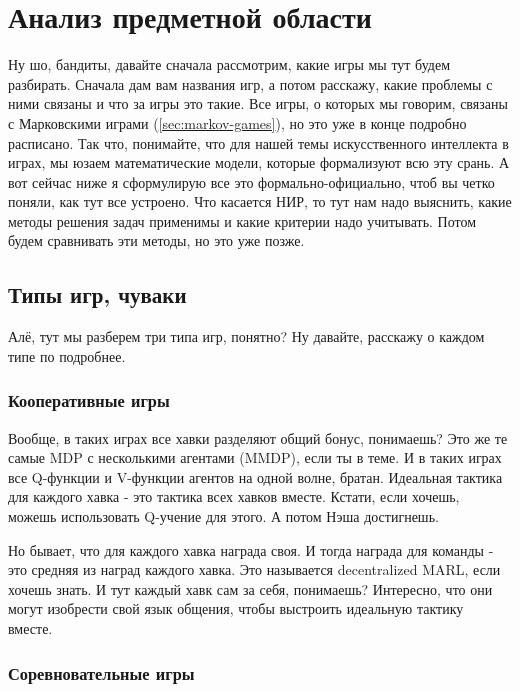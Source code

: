 \chapter{Анализ предметной области}

Ну шо, бандиты, давайте сначала рассмотрим, какие игры мы тут будем разбирать. Сначала дам вам названия игр, а потом расскажу, какие проблемы с ними связаны и что за игры это такие.
Все игры, о которых мы говорим, связаны с Марковскими играми (\ref{sec:markov-games}), но это уже в конце подробно расписано.
Так что, понимайте, что для нашей темы искусственного интеллекта в играх, мы юзаем математические модели, которые формализуют всю эту срань.
А вот сейчас ниже я сформулирую все это формально-официально, чтоб вы четко поняли, как тут все устроено.
Что касается НИР, то тут нам надо выяснить, какие методы решения задач применимы и какие критерии надо учитывать. Потом будем сравнивать эти методы, но это уже позже.

\section{Типы игр, чуваки}

Алё, тут мы разберем три типа игр, понятно? Ну давайте, расскажу о каждом типе по подробнее.

\subsection{Кооперативные игры}

Вообще, в таких играх все хавки разделяют общий бонус, понимаешь? Это же те самые MDP с несколькими агентами (MMDP), если ты в теме. И в таких играх все Q-функции и V-функции агентов на одной волне, братан. Идеальная тактика для каждого хавка - это тактика всех хавков вместе. Кстати, если хочешь, можешь использовать Q-учение для этого. А потом Нэша достигнешь.

Но бывает, что для каждого хавка награда своя. И тогда награда для команды - это средняя из наград каждого хавка. Это называется decentralized MARL, если хочешь знать. И тут каждый хавк сам за себя, понимаешь? Интересно, что они могут изобрести свой язык общения, чтобы выстроить идеальную тактику вместе.

\subsection{Соревновательные игры}

